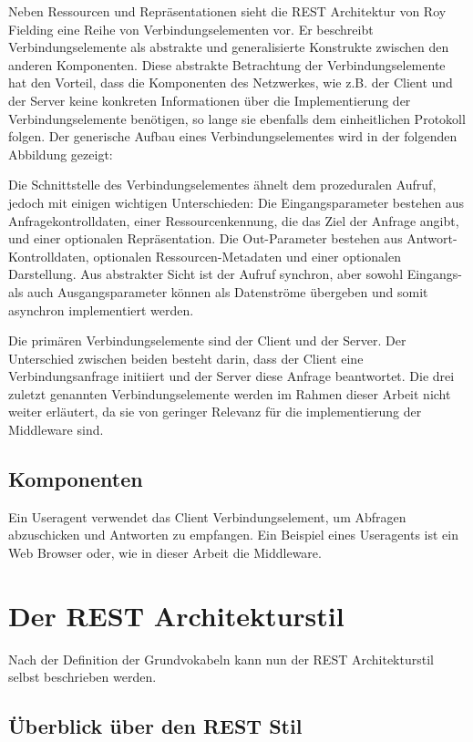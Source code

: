 Neben Ressourcen und Repräsentationen sieht die REST Architektur von Roy Fielding eine Reihe von Verbindungselementen vor. Er beschreibt Verbindungselemente als abstrakte und generalisierte Konstrukte zwischen den anderen Komponenten. Diese abstrakte Betrachtung der Verbindungselemente hat den Vorteil, dass die Komponenten des Netzwerkes, wie z.B. der Client und der Server keine konkreten Informationen über die Implementierung der Verbindungselemente benötigen, so lange sie ebenfalls dem einheitlichen Protokoll folgen. Der generische Aufbau eines Verbindungselementes wird in der folgenden Abbildung gezeigt:

Die Schnittstelle des Verbindungselementes ähnelt dem prozeduralen Aufruf, jedoch mit einigen wichtigen Unterschieden: Die Eingangsparameter bestehen aus Anfragekontrolldaten, einer Ressourcenkennung, die das Ziel der Anfrage angibt, und einer optionalen Repräsentation. Die Out-Parameter bestehen aus Antwort-Kontrolldaten, optionalen Ressourcen-Metadaten und einer optionalen Darstellung. Aus abstrakter Sicht ist der Aufruf synchron, aber sowohl Eingangs- als auch Ausgangsparameter können als Datenströme übergeben und somit asynchron implementiert werden.

Die primären Verbindungselemente sind der Client und der Server. Der Unterschied zwischen beiden besteht darin, dass der Client eine Verbindungsanfrage initiiert und der Server diese Anfrage beantwortet. Die drei zuletzt genannten Verbindungselemente werden im Rahmen dieser Arbeit nicht weiter erläutert, da sie von geringer Relevanz für die implementierung der Middleware sind.

\subsection{Komponenten}\label{subsection:komponenten}

Ein Useragent verwendet das Client Verbindungselement, um Abfragen abzuschicken und Antworten zu empfangen. Ein Beispiel eines Useragents ist ein Web Browser oder, wie in dieser Arbeit die Middleware.

\section{Der REST Architekturstil}\label{subsection:der-rest-architekturstil}

Nach der Definition der Grundvokabeln kann nun der REST Architekturstil selbst beschrieben werden.

\subsection{Überblick über den REST Stil}\label{subsection:ueberblick-ueber-den-rest-stil}

